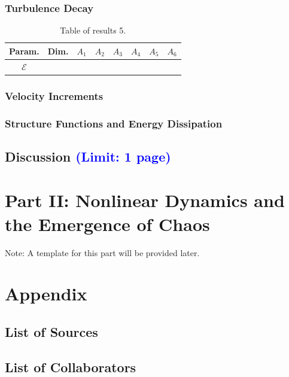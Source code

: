 \documentclass[11pt,titlepage]{article}
\begin{document}
\subsubsection{Turbulence Decay}
\begin{table}[h!]
\centering
\caption{Table of results 5.}
    \begin{tabular}{ | c | c | c | c | c | c | c | c |}
        \hline
        Param. & Dim. & $A_1$ & $A_2$ & $A_3$ & $A_4$ & $A_5$ & $A_6$ \\
        \hline
        $\mathcal{E}$ & & & & & & & \\
        \hline
    \end{tabular}
\end{table}

\subsubsection{Velocity Increments}

\subsubsection{Structure Functions and Energy Dissipation}

\subsection{Discussion \textcolor{blue}{(Limit: 1 page)}} %


\section{Part II: Nonlinear Dynamics and the Emergence of Chaos}

Note: A template for this part will be provided later.





\clearpage
\appendix
\section*{Appendix}
\subsection*{List of Sources}

\subsection*{List of Collaborators}
\end{document}
